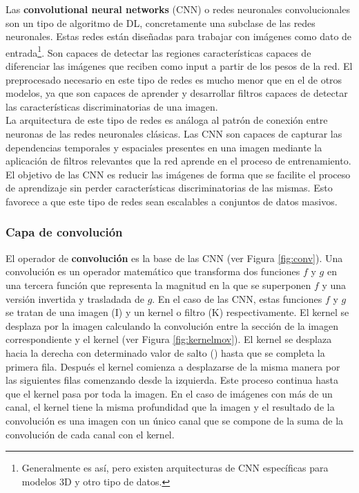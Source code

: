 Las \textbf{convolutional neural networks} (CNN) o redes neuronales convolucionales \cite{lecun1989backpropagation,lecun1998gradient} son un tipo de algoritmo de DL, concretamente una subclase de las redes neuronales. Estas redes están diseñadas para trabajar con imágenes como dato de entrada\footnote{Generalmente es así, pero existen arquitecturas de CNN específicas para modelos 3D y otro tipo de datos.}. Son capaces de detectar las regiones características capaces de diferenciar las imágenes que reciben como input a partir de los pesos de la red. El preprocesado necesario en este tipo de redes es mucho menor que en el de otros modelos, ya que son capaces de aprender y desarrollar filtros capaces de detectar las características discriminatorias de una imagen.\\

La arquitectura de este tipo de redes es análoga al patrón de conexión entre neuronas de las redes neuronales clásicas. Las CNN son capaces de capturar las dependencias temporales y espaciales presentes en una imagen mediante la aplicación de filtros relevantes que la red aprende en el proceso de entrenamiento. El objetivo de las CNN es reducir las imágenes de forma que se facilite el proceso de aprendizaje sin perder características discriminatorias de las mismas. Esto favorece a que este tipo de redes sean escalables a conjuntos de datos masivos.

\subsubsection{Capa de convolución}

El operador de \textbf{convolución} es la base de las CNN (ver Figura \ref{fig:conv}). Una convolución es un operador matemático que transforma dos funciones $f$ y $g$ en una tercera función que representa la magnitud en la que se superponen $f$ y una versión invertida y trasladada de $g$. En el caso de las CNN, estas funciones $f$ y $g$ se tratan de una imagen (I) y un kernel o filtro (K) respectivamente. El kernel se desplaza por la imagen calculando la convolución entre la sección de la imagen correspondiente y el kernel (ver Figura \ref{fig:kernelmov}). El kernel se desplaza hacia la derecha con determinado valor de salto () hasta que se completa la primera fila. Después el kernel comienza a desplazarse de la misma manera por las siguientes filas comenzando desde la izquierda. Este proceso continua hasta que el kernel pasa por toda la imagen. En el caso de imágenes con más de un canal, el kernel tiene la misma profundidad que la imagen y el resultado de la convolución es una imagen con un único canal que se compone de la suma de la convolución de cada canal con el kernel.

